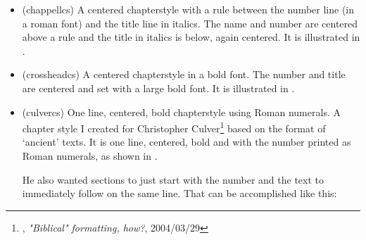 \begin{itemize}
\item[\cstyle{chappell}]
\glossary(chappellcs)%
  {}%
  { A centered chapterstyle with a rule between
   the number line (in a roman font) and the title line in italics.}
The name and number are centered above a rule and the
title in italics is below, again centered. It is illustrated in
.


\item[\cstyle{crosshead}]
\glossary(crossheadcs)%
  {}%
  { A centered chapterstyle in a bold font.}
The number and title are centered and set with a large bold font.
It is illustrated in
.



\item[\cstyle{culver}]
\glossary(culvercs)%
  {}%
  {One line, centered, bold chapterstyle using Roman numerals.}
A chapter style I created for
  Christopher
  Culver\footnote{\ctt, \textit{"Biblical" formatting, how?}, 2004/03/29}
  based on the format of `ancient' texts.
 It is one line, centered, bold and with the number printed as Roman numerals,
as shown in .

\begin{comment}
\makechapterstyle{culver}{
  \chapterstyle{default}
  \chapterstyle{article}
  \renewcommand*{\thechapter}{\Roman{chapter}}
  \renewcommand*{\printchapternum}{%
    \centering\chapnumfont \thechapter\space\space}%
  \renewcommand*{\printchapternonum}{\centering}
  \renewcommand*{\clearforchapter}{}%
  \aliaspagestyle{chapter}{headings}%
}
\end{comment}


    He also wanted sections to just start with the number and the text to
immediately follow on the same line. That can be accomplished like this:
\begin{lcode}
\renewcommand*{\thesection}{\arabic{section}}
\renewcommand*{\section}[1]{%
  \refstepcounter{section}%
  \par\noindent
  \textbf{\thesection.}%
  \space\nolinebreak}
\end{lcode}


\end{itemize}
